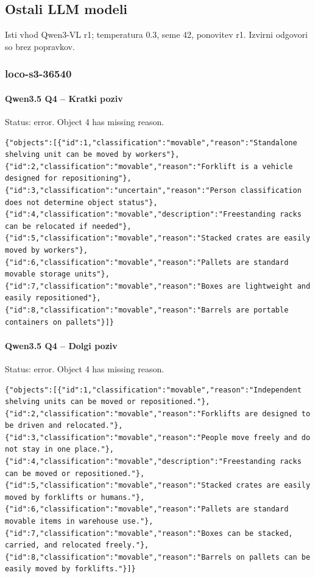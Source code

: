 \clearpage
\subsection{Ostali LLM modeli}
Isti vhod Qwen3-VL r1; temperatura 0.3, seme 42, ponovitev r1. Izvirni odgovori so brez popravkov.
\subsubsection{loco-s3-36540}
\paragraph{Qwen3.5 Q4 -- Kratki poziv}
Status: error. Object 4 has missing reason.
\begin{lstlisting}
{"objects":[{"id":1,"classification":"movable","reason":"Standalone shelving unit can be moved by workers"},{"id":2,"classification":"movable","reason":"Forklift is a vehicle designed for repositioning"},{"id":3,"classification":"uncertain","reason":"Person classification does not determine object status"},{"id":4,"classification":"movable","description":"Freestanding racks can be relocated if needed"},{"id":5,"classification":"movable","reason":"Stacked crates are easily moved by workers"},{"id":6,"classification":"movable","reason":"Pallets are standard movable storage units"},{"id":7,"classification":"movable","reason":"Boxes are lightweight and easily repositioned"},{"id":8,"classification":"movable","reason":"Barrels are portable containers on pallets"}]}
\end{lstlisting}
\paragraph{Qwen3.5 Q4 -- Dolgi poziv}
Status: error. Object 4 has missing reason.
\begin{lstlisting}
{"objects":[{"id":1,"classification":"movable","reason":"Independent shelving units can be moved or repositioned."},{"id":2,"classification":"movable","reason":"Forklifts are designed to be driven and relocated."},{"id":3,"classification":"movable","reason":"People move freely and do not stay in one place."},{"id":4,"classification":"movable","description":"Freestanding racks can be moved or repositioned."},{"id":5,"classification":"movable","reason":"Stacked crates are easily moved by forklifts or humans."},{"id":6,"classification":"movable","reason":"Pallets are standard movable items in warehouse use."},{"id":7,"classification":"movable","reason":"Boxes can be stacked, carried, and relocated freely."},{"id":8,"classification":"movable","reason":"Barrels on pallets can be easily moved by forklifts."}]}
\end{lstlisting}
